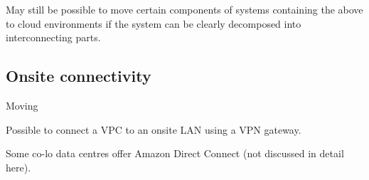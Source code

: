 \documentclass[slides]{pgnotes}
\begin{document}
May still be possible to move certain components of systems containing
the above to cloud environments if the system can be clearly decomposed
into interconnecting parts.

\subsection{Onsite connectivity}\label{onsite-connectivity}

Moving

Possible to connect a VPC to an onsite LAN using a VPN gateway.

Some co-lo data centres offer Amazon Direct Connect (not discussed in
detail here).
\end{document}
